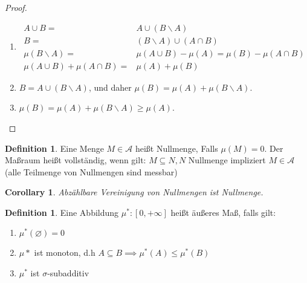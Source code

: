 \documentclass[prb,12pt]{revtex4-2}
\newtheorem{Corollary}[Theorem]{Corollary}
\theoremstyle{definition}
\theoremstyle{definition}
\newtheorem{Definition}[Theorem]{Definition}
\begin{document}
\begin{proof}
	\begin{enumerate}
		\item 
			\begin{align*}
				A \cup B=&A\cup(B\backslash A)\\
				B =& (B\backslash A)\cup (A \cap B)\\
				\mu(B\backslash A)=&\mu(A\cup B)-\mu(A)=\mu(B)-\mu(A \cap B)\\
				\mu(A\cup B)+\mu(A\cap B)=& \mu(A)+\mu(B)
			\end{align*}
		\item $B=A\cup (B\backslash A)$, und daher $\mu(B)=\mu(A)+\mu(B\backslash A)$.
		\item $\mu(B)=\mu(A)+\mu(B\backslash A)\ge \mu(A)$.
	\end{enumerate}
	\end{proof}
	\begin{Definition}
		Eine Menge $M\in \mathcal{A}$ heißt Nullmenge, Falls $\mu(M) =0$. Der Maßraum heißt vollständig, wenn gilt: $M \subseteq N, N$ Nullmenge impliziert $M\in \mathcal{A}$ (alle Teilmenge von Nullmengen sind messbar)
	\end{Definition}
	\begin{Corollary}
		Abz\"{a}hlbare Vereinigung von Nullmengen ist Nullmenge.
	\end{Corollary}
\begin{Definition}
	Eine Abbildung $\mu^*:[0,+\infty]$ heißt äußeres Maß, falls gilt:
	\begin{enumerate}
		\item $\mu^*(\varnothing)=0$ 
		\item $\mu*$ ist monoton, d.h $A\subseteq B\implies \mu^*(A)\le \mu^*(B)$ 
		\item $\mu^*$ ist $\sigma$-subadditiv
	\end{enumerate}
\end{Definition}
\end{document}
